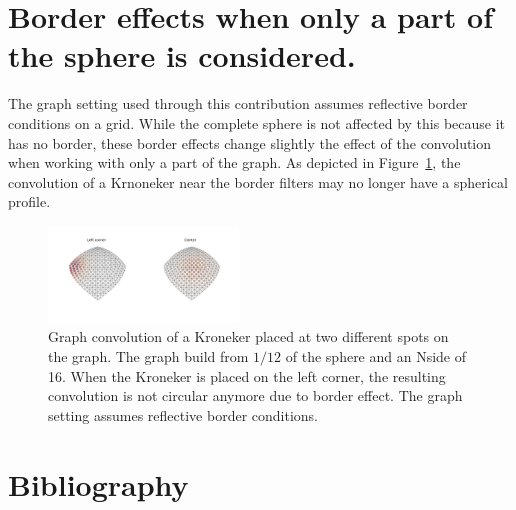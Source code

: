 \documentclass[final,twocolumn,3p,times,authoryear]{elsarticle}
\newcommand{\figref}[1]{Figure~\ref{fig:#1}}
\newcommand{\1}{\b{1}}              %
\newcommand{\0}{\b{0}}              %
\begin{document}
\section{Border effects when only a part of the sphere is considered.}
\label{sec:border_effects}
The graph setting used through this contribution assumes reflective border conditions on a grid. While the complete sphere is not affected by this because it has no border, these border effects change slightly the effect of the convolution when working with only a part of the graph.  As depicted in \figref{border_effects}, the convolution of a Krnoneker near the border filters may no longer have a spherical profile.

\begin{figure}[!ht]
\centering
\includegraphics[width=0.45\textwidth]{figures/border_effects.pdf}
\caption{Graph convolution of a Kroneker placed at two different spots on the graph. The graph build from $1/12$ of the sphere and an Nside of 16. When the Kroneker is placed on the left corner, the resulting convolution is not circular anymore due to border effect. The graph setting assumes reflective border conditions.}
\label{fig:border_effects}
\end{figure}

\section*{Bibliography}


\end{document}
